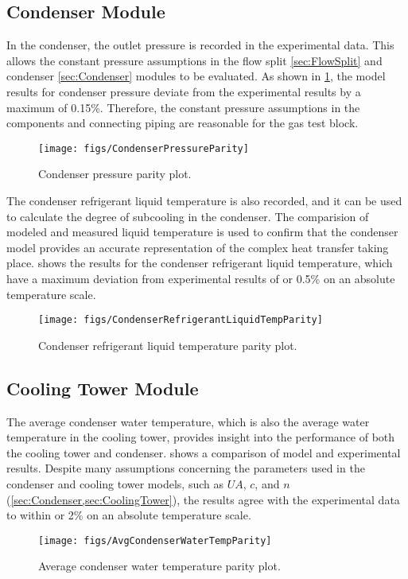 \subsection{Condenser Module} \label{sec:condresult}
In the condenser, the outlet pressure is recorded in the experimental data.
This allows the constant pressure assumptions in the flow split \cref{sec:FlowSplit}
and condenser \cref{sec:Condenser} modules to be evaluated.
As shown in \cref{fig:CondPressParity}, the model results for condenser pressure
deviate from the experimental results by a maximum of 0.15\%.
Therefore, the constant pressure assumptions in the components
and connecting piping are reasonable for the  gas test block.
\begin{figure}[tbp]
  \centering
  \texttt{[image: figs/CondenserPressureParity]}
  \caption{Condenser pressure parity plot.}
  \label{fig:CondPressParity}
\end{figure}

The condenser refrigerant liquid temperature is also recorded,
and it can be used to calculate the degree of subcooling in the condenser.
The comparision of modeled and measured liquid temperature is 
used to confirm that the condenser model provides an
accurate representation of the complex heat transfer taking place.
 shows the results for the condenser
refrigerant liquid temperature, which have a maximum deviation from
experimental results of  or 0.5\% on an absolute temperature scale.
\begin{figure}[tbp]
  \centering
  \texttt{[image: figs/CondenserRefrigerantLiquidTempParity]}
  \caption{Condenser refrigerant liquid temperature parity plot.}
  \label{fig:CondRefLiqTempParity}
\end{figure}

\subsection{Cooling Tower Module}
The average condenser water temperature, which is also the 
average water temperature in the cooling tower, provides insight
into the performance of both the cooling tower and condenser.
 shows a comparison of model and
experimental results.
Despite many assumptions concerning the parameters used in the condenser
and cooling tower models, such as $UA$, $c$, and $n$ (\cref{sec:Condenser,sec:CoolingTower}),
the results agree with the experimental data to within 
or 2\% on an absolute temperature scale.
\begin{figure}[tbp]
  \centering
  \texttt{[image: figs/AvgCondenserWaterTempParity]}
  \caption{Average condenser water temperature parity plot.}
  \label{fig:AvgCondWatTempParity}
\end{figure}

